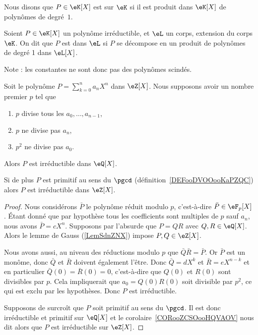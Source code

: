 \begin{definition}  \label{DefCPLSooQaHJKQ}\label{DefPolynomeScinde}
	Nous disons que \( P\in\eK[X]\) est  sur \(\eK\) si il est produit dans \(\eK[X]\) de polynômes de degré~\( 1\).

	Soient \( P\in\eK[X]\) un polynôme irréductible, et \( \eL\) un corps, extension du corps \( \eK\). On dit que \( P \) est  dans \( \eL \) si \( P \) se décompose en un produit de polynômes de degré 1 dans \( \eL[X]\).
\end{definition}
Note : les constantes ne sont donc pas des polynômes scindés.

\begin{proposition}
	Soit le polynôme \( P=\sum_{k=0}^n a_nX^n\) dans \( \eZ[X]\). Nous supposons avoir un nombre premier \( p\) tel que
	\begin{enumerate}
		\item
		      \( p\) divise tous les \( a_0,\ldots, a_{n-1}\),
		\item
		      \( p\) ne divise pas \( a_n\),
		\item
		      \( p^2\) ne divise pas \( a_0\).
	\end{enumerate}
	Alors \( P\) est irréductible dans \( \eQ[X]\).

	Si de plus \( P\) est primitif au sens du \( \pgcd\) (définition~\ref{DEFooDVOOooKaPZQC}) alors \( P\) est irréductible dans \( \eZ[X]\).
\end{proposition}

\begin{proof}
	Nous considérons \( \bar P\) le polynôme réduit modulo \( p\), c'est-à-dire \( \bar P\in \eF_p[X]\). Étant donné que par hypothèse tous les coefficients sont multiples de \( p\) sauf \( a_n\), nous avons \( \bar P=cX^n\). Supposons par l'absurde que \( P=QR\) avec \( Q,R\in \eQ[X]\). Alors le lemme de Gauss (\ref{LemSdnZNX}) impose \( P,Q\in \eZ[X]\).

	Nous avons aussi, au niveau des réductions modulo \( p\) que \( \bar Q\bar R=\bar P\). Or \( \bar P\) est un monôme, donc \( \bar Q\) et \( \bar R\) doivent également l'être. Donc \( \bar Q=dX^k\) et \( \bar R=eX^{n-k}\) et en particulier \( \bar Q(0)=\bar R(0)=0\), c'est-à-dire que \( Q(0)\) et \( R(0)\) sont divisibles par \( p\). Cela impliquerait que \( a_0=Q(0)R(0)\) soit divisible par \( p^2\), ce qui est exclu par les hypothèses. Donc \( P\) est irréductible.

	Supposons de surcroît que \( P\) soit primitif au sens du \( \pgcd\). Il est donc irréductible et primitif sur \( \eQ[X]\) et le corolaire~\ref{CORooZCSOooHQVAOV} nous dit alors que \( P\) est irréductible sur \( \eZ[X]\).
\end{proof}

